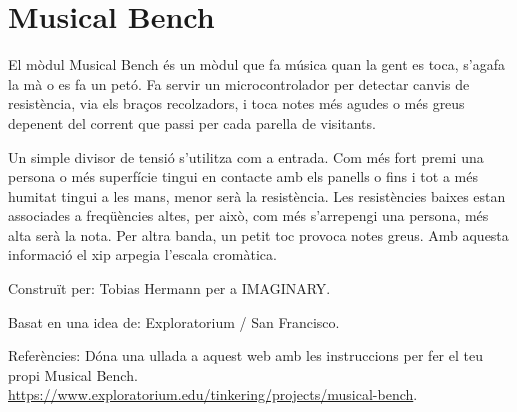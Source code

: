 \section{Musical Bench}
El mòdul Musical Bench és un mòdul que fa música quan la gent es toca, s'agafa la mà o es fa un petó. Fa servir un microcontrolador per detectar canvis de resistència, via els braços recolzadors, i toca notes més agudes o més greus depenent del corrent que passi per cada parella de visitants. 

Un simple divisor de tensió s'utilitza com a entrada. Com més fort premi una persona o més superfície tingui en contacte amb els panells o fins i tot a més humitat tingui a les mans, menor serà la resistència. Les resistències baixes estan associades a freqüències altes, per això, com més s'arrepengi una persona, més alta serà la nota. Per altra banda, un petit toc provoca notes greus. Amb aquesta informació el xip arpegia l'escala cromàtica. 

\begin{sectcredits}

\item[Construït per:] Tobias Hermann per a IMAGINARY.
\item[Basat en una idea de:] Exploratorium / San Francisco.

\item[Referències:]
Dóna una ullada a aquest web amb les instruccions per fer el teu propi Musical Bench.\\
\url{https://www.exploratorium.edu/tinkering/projects/musical-bench}.

\end{sectcredits}
